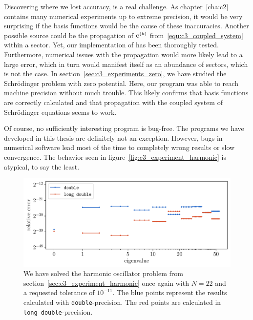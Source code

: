 Discovering where we lost accuracy, is a real challenge. As chapter~\ref{cha:c2} contains many numerical experiments up to extreme precision, it would be very surprising if the basis functions would be the cause of these inaccuracies. Another possible source could be the propagation of $\vb{c}^{(k)}$ from~\eqref{equ:c3_coupled_system} within a sector. Yet, our implementation of \matscs{} has been thoroughly tested. Furthermore, numerical issues with the propagation would more likely lead to a large error, which in turn would manifest itself as an abundance of sectors, which is not the case. In section~\ref{sec:c3_experiments_zero}, we have studied the Schrödinger problem with zero potential. Here, our program was able to reach machine precision without much trouble. This likely confirms that basis functions are correctly calculated and that propagation with the coupled system of Schrödinger equations seems to work.

Of course, no sufficiently interesting program is bug-free. The programs we have developed in this thesis are definitely not an exception. However, bugs in numerical software lead most of the time to completely wrong results or slow convergence. The behavior seen in figure~\ref{fig:c3_experiment_harmonic} is atypical, to say the least.

\begin{figure}
  \begin{center}
    \includegraphics[width=\textwidth]{img/chapter3/experiments/harmonic_analysis.pdf}
    \caption{We have solved the harmonic oscillator problem from section~\ref{sec:c3_experiment_harmonic} once again with $N = 22$ and a requested tolerance of $10^{-11}$. The blue points represent the results calculated with \texttt{double}-precision. The red points are calculated in \texttt{long double}-precision.}\label{fig:c3_harmonic_analysis}
  \end{center}
\end{figure}

